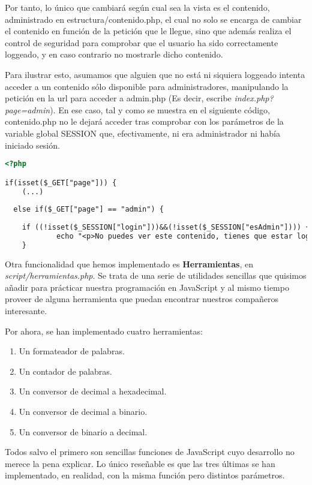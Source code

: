 \documentclass[12pt]{report}
\begin{document}
Por tanto, lo único que cambiará según cual sea la vista es el contenido, administrado en estructura/contenido.php, el cual no solo se encarga de cambiar el contenido en función de la petición que le llegue, sino que además realiza el control de seguridad para comprobar que el usuario ha sido correctamente loggeado, y en caso contrario no mostrarle dicho contenido.

Para ilustrar esto, asumamos que alguien que no está ni siquiera loggeado intenta acceder a un contenido sólo disponible para administradores, manipulando la petición en la url para acceder a admin.php (Es decir, escribe \textit{index.php?page=admin}). En ese caso, tal y como se muestra en el siguiente código, contenido.php no le dejará acceder tras comprobar con los parámetros de la variable global SESSION que, efectivamente, ni era administrador ni había iniciado sesión.
\newline
\begin{lstlisting}[language=HTML]
<?php 

if(isset($_GET["page"])) {
    (...)
    
  else if($_GET["page"] == "admin") {
    
    if ((!isset($_SESSION["login"]))&&(!isset($_SESSION["esAdmin"]))) {
            echo "<p>No puedes ver este contenido, tienes que estar loggeado y ser Administrador para visualizarlo.</p>";
    }
\end{lstlisting}

Otra funcionalidad que hemos implementado es \textbf{Herramientas}, en \textit{script/herramientas.php}. Se trata de una serie de utilidades sencillas que quisimos añadir para prácticar nuestra programación en JavaScript y al mismo tiempo proveer de alguna herramienta que puedan encontrar nuestros compañeros interesante. 

Por ahora, se han implementado cuatro herramientas:
\begin{enumerate}
    \item Un formateador de palabras.
    \item Un contador de palabras.
    \item Un conversor de decimal a hexadecimal.
    \item Un conversor de decimal a binario.
    \item Un conversor de binario a decimal.
\end{enumerate}
Todos salvo el primero son sencillas funciones de JavaScript cuyo desarrollo no merece la pena explicar. Lo único reseñable es que las tres últimas se han implementado, en realidad, con la misma función pero distintos parámetros.
\end{document}
